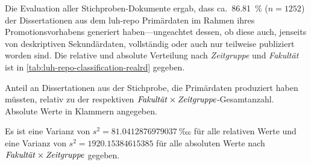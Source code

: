 Die Evaluation aller Stichproben-Dokumente ergab, dass ca.~\SI{86,81}{\percent} ($n=\num{1252}$) der Dissertationen aus dem \gls{luh-repo} Primärdaten im Rahmen ihres Promotionsvorhabens generiert haben---ungeachtet dessen, ob diese auch, jenseits von deskriptiven Sekundärdaten, vollständig oder auch nur teilweise publiziert worden sind.
Die relative und absolute Verteilung nach \textit{Zeitgruppe} und \textit{Fakultät} ist in \cref{tab:luh-repo-classification-realrd} gegeben.
\begin{table}[!htbp]
	\caption{Anteil an Dissertationen aus der Stichprobe, die Primärdaten produziert haben müssten, relativ zu der respektiven $\text{\textit{Fakultät}}\times\text{\textit{Zeitgruppe}}$-Gesamtanzahl.
    Absolute Werte in Klammern angegeben.}
    
    \label{tab:luh-repo-classification-realrd}
\end{table}
Es ist eine Varianz von $s^2=\SI[round-mode=places,round-precision=3]{81.0412876979037}{‱}$ für alle relativen Werte und eine Varianz von $s^2=\num[round-mode=places,round-precision=3]{1920.15384615385}$ für alle absoluten Werte nach $\text{\textit{Fakultät}}\times\text{\textit{Zeitgruppe}}$ gegeben.

